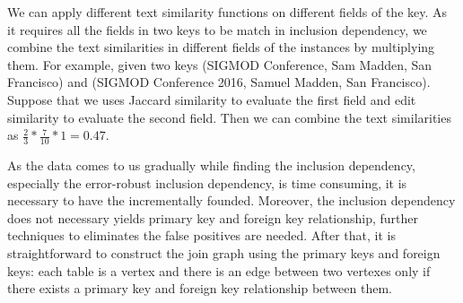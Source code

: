 
\iffalse
\begin{definition}[Error-Robust Inclusion Dependency]
Given two projections \RX and \SY on relational tables and an error-tolerating threshold $\delta$, there is an error-robust inclusion dependency from \X to \Y when $\EIND\geq\delta$.
\end{definition}

\dong{To add an example here.}
\fi

We can apply different text similarity functions on different fields of the key. As it requires all the fields in two keys to be match in inclusion dependency, we combine the text similarities in different fields of the instances by multiplying them. For example, given two keys \textsf{(SIGMOD Conference, Sam Madden, San Francisco)} and \textsf{(SIGMOD Conference 2016, Samuel Madden, San Francisco)}. Suppose that we uses Jaccard similarity to evaluate the first field and edit similarity to evaluate the second field. Then we can combine the text similarities as $\frac{2}{3}*\frac{7}{10}*1=0.47$.


As the data comes to us gradually while finding the inclusion dependency, especially the error-robust inclusion dependency, is time consuming, it is necessary to have the \eind incrementally founded. Moreover, the inclusion dependency does not necessary yields primary key and foreign key relationship, further techniques to eliminates the false positives are needed. After that, it is straightforward to construct the join graph using the primary keys and foreign keys: each table is a vertex and there is an edge between two vertexes only if there exists a primary key and foreign key relationship between them. 



